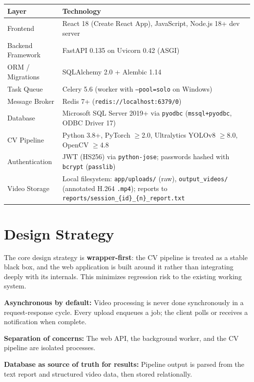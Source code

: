 ﻿\documentclass[11pt,a4paper]{article}
\begin{document}
\begin{longtable}{|L{4cm}|L{10cm}|}
\hline
\textbf{Layer} & \textbf{Technology} \\ \hline
Frontend & React 18 (Create React App), JavaScript, Node.js 18+ dev server \\ \hline
Backend Framework & FastAPI 0.135 on Uvicorn 0.42 (ASGI) \\ \hline
ORM / Migrations & SQLAlchemy 2.0 + Alembic 1.14 \\ \hline
Task Queue & Celery 5.6 (worker with \texttt{--pool=solo} on Windows) \\ \hline
Message Broker & Redis 7+ (\texttt{redis://localhost:6379/0}) \\ \hline
Database & Microsoft SQL Server 2019+ via \texttt{pyodbc} (\texttt{mssql+pyodbc}, ODBC Driver 17) \\ \hline
CV Pipeline & Python 3.8+, PyTorch $\geq$2.0, Ultralytics YOLOv8 $\geq$8.0, OpenCV $\geq$4.8 \\ \hline
Authentication & JWT (HS256) via \texttt{python-jose}; passwords hashed with \texttt{bcrypt} (\texttt{passlib}) \\ \hline
Video Storage & Local filesystem: \texttt{app/uploads/} (raw), \texttt{output\_videos/} (annotated H.264 \texttt{.mp4}); reports to \texttt{reports/session\_\{id\}\_\{n\}\_report.txt} \\ \hline
\end{longtable}

\section{Design Strategy}

The core design strategy is \textbf{wrapper-first}: the CV pipeline is treated as a stable black box, and the web application is built around it rather than integrating deeply with its internals. This minimizes regression risk to the existing working system.

\textbf{Asynchronous by default:} Video processing is never done synchronously in a request-response cycle. Every upload enqueues a job; the client polls or receives a notification when complete.

\textbf{Separation of concerns:} The web API, the background worker, and the CV pipeline are isolated processes.

\textbf{Database as source of truth for results:} Pipeline output is parsed from the text report and structured video data, then stored relationally.
\end{document}
